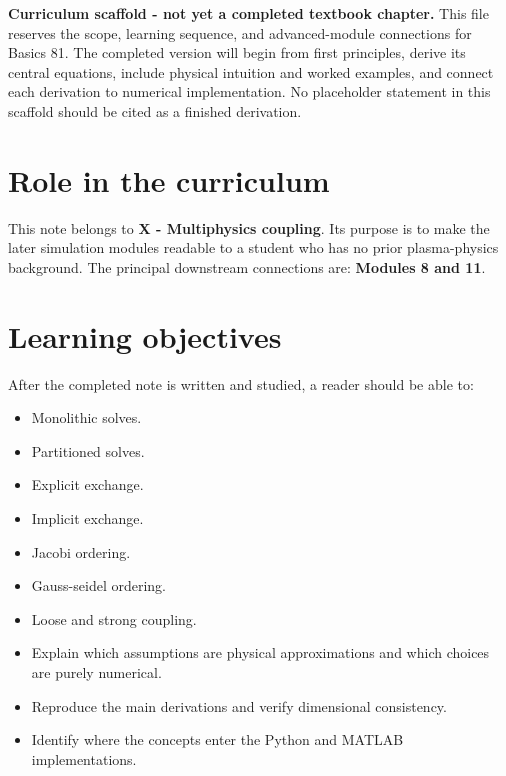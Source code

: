 \documentclass[11pt]{article}
\begin{document}

\begin{overviewbox}
\textbf{Curriculum scaffold - not yet a completed textbook chapter.} This file reserves the scope, learning sequence, and advanced-module connections for Basics 81. The completed version will begin from first principles, derive its central equations, include physical intuition and worked examples, and connect each derivation to numerical implementation. No placeholder statement in this scaffold should be cited as a finished derivation.
\end{overviewbox}

\ProjectTOC

\section{Role in the curriculum}
This note belongs to \textbf{X - Multiphysics coupling}. Its purpose is to make the later simulation modules readable to a student who has no prior plasma-physics background. The principal downstream connections are: \textbf{Modules 8 and 11}.

\section{Learning objectives}
After the completed note is written and studied, a reader should be able to:
\begin{itemize}[leftmargin=1.6em]
\item Monolithic solves.
\item Partitioned solves.
\item Explicit exchange.
\item Implicit exchange.
\item Jacobi ordering.
\item Gauss-seidel ordering.
\item Loose and strong coupling.
\item Explain which assumptions are physical approximations and which choices are purely numerical.
\item Reproduce the main derivations and verify dimensional consistency.
\item Identify where the concepts enter the Python and MATLAB implementations.
\end{itemize}
\end{document}
